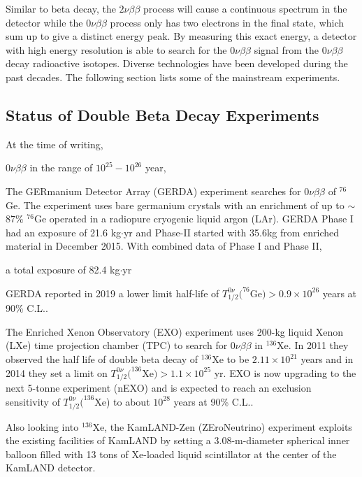 Similar to beta decay, the $2\nu\beta\beta$ process will cause a continuous spectrum in the detector while the $0\nu\beta\beta$ process only has two electrons in the final state, which sum up to give a distinct energy peak. By measuring this exact energy, a detector with high energy resolution is able to search for the $0\nu\beta\beta$ signal from the $0\nu\beta\beta$ decay radioactive isotopes. Diverse technologies have been developed during the past decades. The following section lists some of the mainstream experiments.

\subsection{Status of Double Beta Decay Experiments}

At the time of writing, 

$0\nu\beta\beta$ in the range of $10^{25}-10^{26}$ year,











The GERmanium Detector Array (GERDA) experiment searches for $0\nu\beta\beta$ of $^{76}$Ge. The experiment uses bare germanium crystals with an enrichment of up to $\sim$87\% $^{76}$Ge operated in a radiopure cryogenic liquid argon (LAr). GERDA Phase I had an exposure of 21.6 kg$\cdot$yr and Phase-II started with 35.6kg from enriched material in December 2015. With combined data of Phase I and Phase II, 

a total exposure of 82.4 kg$\cdot$yr 



GERDA reported in 2019 a lower limit half-life of $T^{0\nu}_{1/2}(^{76}$Ge$)>0.9\times 10^{26}$ years at 90\% C.L.\cite{gerda,gerda2}.




The Enriched Xenon Observatory (EXO) experiment uses 200-kg liquid Xenon (LXe) time projection chamber (TPC) to search for $0\nu\beta\beta$ in $^{136}$Xe. In 2011 they observed the half life of double beta decay of $^{136}$Xe to be $2.11\times 10^{21}$ years and in 2014 they set a limit on $T^{0\nu}_{1/2}(^{136}$Xe$)>1.1\times 10^{25}$ yr\cite{exo}. EXO is now upgrading to the next 5-tonne experiment (nEXO) and is expected to reach an exclusion sensitivity of $T^{0\nu}_{1/2}(^{136}$Xe) to about $10^{28}$ years at 90\% C.L.\cite{nEXO}.

Also looking into $^{136}$Xe, the KamLAND-Zen (ZEroNeutrino) experiment exploits the existing facilities of KamLAND by setting a 3.08-m-diameter spherical inner balloon filled with 13 tons of Xe-loaded liquid scintillator at the center of the KamLAND detector.

